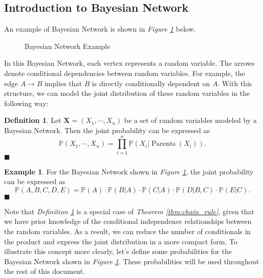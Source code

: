 \documentclass{article}
\theoremstyle{definition}
\newtheorem{definition}{Definition}
\newtheorem{example}{Example}
\newenvironment{definitionqed}
    {\begin{definition}}
    {\hfill \qedsymbol \end{definition}}
\newenvironment{exampleqed}
    {\begin{example}}
    {\hfill \qedsymbol \end{example}}
\renewcommand{\qedsymbol}{\(\blacksquare\)}
\newcommand{\X}{\mathbf{X}}
\renewcommand{\P}{\mathbb{P}}
\begin{document}
\subsection{Introduction to Bayesian Network}

An example of Bayesian Network is shown in \textit{Figure \ref{fig:bayesian_network}} below.

\begin{figure}[htbp]
    \centering
    \caption{Bayesian Network Example}
    \label{fig:bayesian_network}
\end{figure}

In this Bayesian Network, each vertex represents a random variable. The arrows denote conditional dependencies between random variables. For example, the edge \(A \longrightarrow B\) implies that \(B\) is directly conditionally dependent on \(A\). With this structure, we can model the joint distribution of these random variables in the following way:

\begin{definitionqed} \label{def:bayesian_network}
    Let \(\X = (X_1, \cdots, X_n)\) be a set of random variables modeled by a Bayesian Network. Then the joint probability can be expressed as
    \[\P(X_1, \cdots, X_n) = \prod_{i=1}^n \P(X_i | \operatorname{Parents}(X_i)).\]
\end{definitionqed}

\begin{exampleqed} \label{ex:bayesian_network}
    For the Bayesian Network shown in \textit{Figure \ref{fig:bayesian_network}}, the joint probability can be expressed as
    \[\P(A, B, C, D, E) = \P(A)\cdot\P(B|A)\cdot\P(C|A)\cdot\P(D|B,C)\cdot\P(E|C).\]
\end{exampleqed}

Note that \textit{Definition \ref{def:bayesian_network}} is a special case of \textit{Theorem \ref{thm:chain_rule}}, given that we have prior knowledge of the conditional independence relationships between the random variables. As a result, we can reduce the number of conditionals in the product and express the joint distribution in a more compact form. To illustrate this concept more clearly, let's define some probabilities for the Bayesian Network shown in \textit{Figure \ref{fig:bayesian_network}}. These probabilities will be used throughout the rest of this document.
\end{document}
